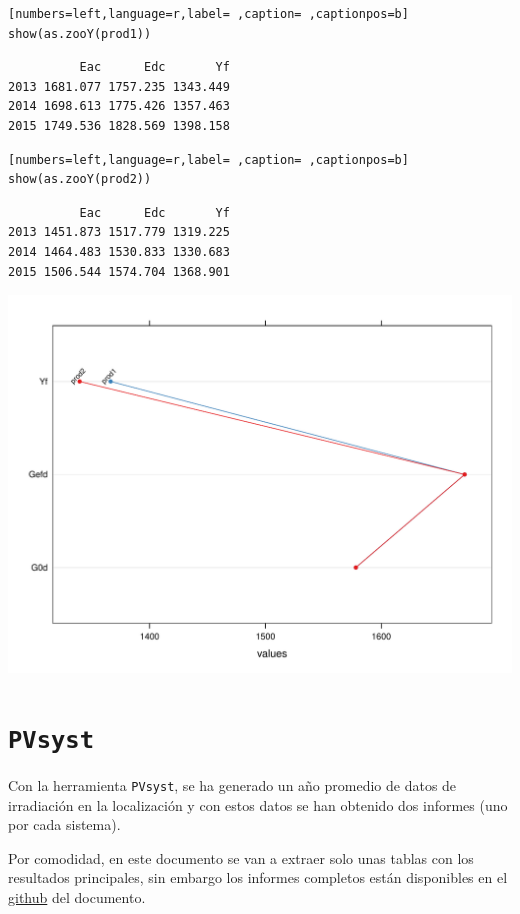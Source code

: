 \begin{lstlisting}[numbers=left,language=r,label= ,caption= ,captionpos=b]
show(as.zooY(prod1))
\end{lstlisting}

\begin{verbatim}
          Eac      Edc       Yf
2013 1681.077 1757.235 1343.449
2014 1698.613 1775.426 1357.463
2015 1749.536 1828.569 1398.158
\end{verbatim}


\begin{lstlisting}[numbers=left,language=r,label= ,caption= ,captionpos=b]
show(as.zooY(prod2))
\end{lstlisting}

\begin{verbatim}
          Eac      Edc       Yf
2013 1451.873 1517.779 1319.225
2014 1464.483 1530.833 1330.683
2015 1506.544 1574.704 1368.901
\end{verbatim}


\begin{center}
\includegraphics[width=.9\linewidth]{figuras/ejemplos2.pdf}
\end{center}
\section{\texttt{PVsyst}}
\label{sec:org4da5687}
Con la herramienta \texttt{PVsyst}, se ha generado un año promedio de datos de irradiación en la localización y con estos datos se han obtenido dos informes (uno por cada sistema).

Por comodidad, en este documento se van a extraer solo unas tablas con los resultados principales, sin embargo los informes completos están disponibles en el \href{https://github.com/solarization/TFG\_Francisco\_Delgado\_Lopez}{github} del documento.

